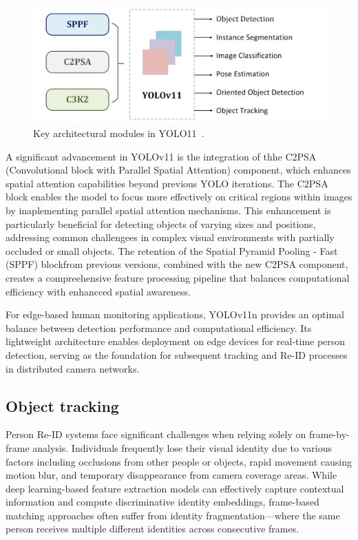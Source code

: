 \documentclass[../main.tex]{subfiles}
\begin{document}
\begin{figure}[h!]
\centering
\includegraphics[width=\linewidth]{Figure/yolov11.png}
\caption{ Key architectural modules in YOLO11~\cite{khanam2024yolov11overviewkeyarchitectural}.}
\label{fig:yolov11}
\end{figure}

A significant advancement in YOLOv11 is the integration of thhe C2PSA \\(Convolutional
block with Parallel Spatial Attention) component, which enhances spatial attention capabilities beyond previous YOLO iterations. The C2PSA block enables the model to focus more effectively on critical regions within images by inaplementing parallel spatial
attention mechanisms. This enhancement is particularly beneficial for detecting objects of varying sizes and positions, addressing common challengees in complex visual environments with partially occluded or small objects. The retention of the Spatial Pyramid Pooling - Fast (SPPF) blockfrom previous versions, combined with the new C2PSA component, creates a compreehensive feature processing pipeline that balances computational efficiency with enhancced spatial awareness.

For edge-based human monitoring applications, YOLOv11n provides an optimal balance between detection performance and computational efficiency. Its lightweight architecture enables deployment on edge devices for real-time person detection, serving as the foundation for subsequent tracking and Re-ID processes in distributed camera networks.

\subsection{Object tracking}
\label{sec:objtrack}

Person Re-ID systems face significant challenges when relying solely on frame-by-frame analysis. Individuals frequently lose their visual identity due to various factors including occlusions from other people or objects, rapid movement causing motion blur, and temporary disappearance from camera coverage areas. While deep learning-based feature extraction models can effectively capture contextual information and compute discriminative identity embeddings, frame-based matching approaches often suffer from identity fragmentation—where the same person receives multiple different identities across consecutive frames.
\end{document}
